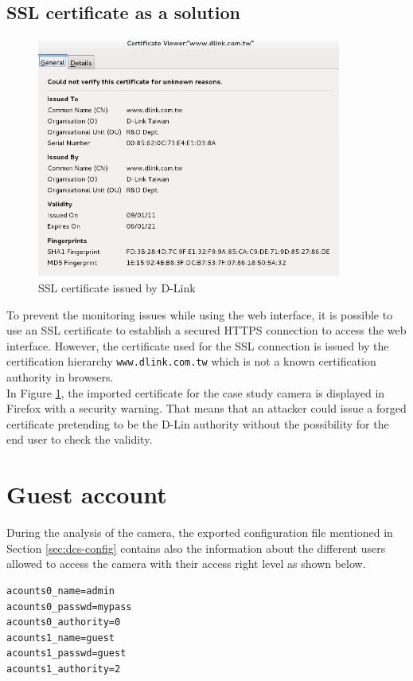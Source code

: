 \subsection{SSL certificate as a solution}

\begin{figure}[h]
  \centering
  \includegraphics[width=10cm]{images/dcs-ssl.png}
  \caption{SSL certificate issued by D-Link}
  \label{fig:dcs-ssl}
\end{figure}


To prevent the monitoring issues while using the web interface, it is possible to use an SSL certificate to establish a secured HTTPS connection to access the web interface.
However, the certificate used for the SSL connection is issued by the certification hierarchy \texttt{www.dlink.com.tw} which is not a known certification authority in browsers.\\

In Figure \ref{fig:dcs-ssl}, the imported certificate for the case study camera is displayed in Firefox with a security warning.
That means that an attacker could issue a forged certificate pretending to be the D-Lin authority without the possibility for the end user to check the validity.

\section{Guest account}
\label{sec:dcs-guest}

During the analysis of the camera, the exported configuration file mentioned in Section \ref{sec:dcs-config} contains also the information about the different users allowed to access the camera with their access right level as shown below.

\begin{verbatim}
acounts0_name=admin
acounts0_passwd=mypass
acounts0_authority=0
acounts1_name=guest
acounts1_passwd=guest
acounts1_authority=2
\end{verbatim}


